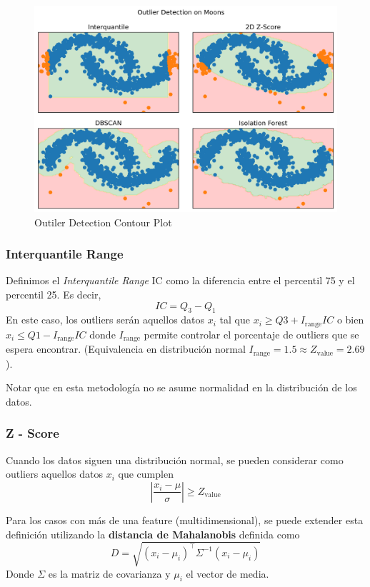 \begin{figure}[H]
    \center
    \includegraphics[scale=0.55]{notebooks/Others/img/outlier_detection.png}
    \caption{Outiler Detection Contour Plot}
\end{figure}

\subsubsection{Interquantile Range}

Definimos el \textit{Interquantile Range} IC como la diferencia entre el percentil 75 y el percentil 25. Es decir, 
$$ 
IC = Q_3 - Q_1
$$
En este caso, los outliers serán aquellos datos $x_i$ tal que 
$x_i \geq Q3 + I_{\text{range}}IC$ o bien $x_i \leq Q1 - I_{\text{range}}IC$
donde $ I_{\text{range}}$ permite controlar el porcentaje de outliers que se espera encontrar. (Equivalencia en distribución normal $I_{\text{range}} = 1.5 \approx Z_{\text{value}} = 2.69$).

Notar que en esta metodología no se asume normalidad en la distribución de los datos. 

\subsubsection{Z - Score}

Cuando los datos siguen una distribución normal, se pueden considerar como outliers aquellos datos $x_i$ que cumplen 
$$\left | \frac{x_i - \mu}{\sigma}\right | \geq Z_{\text{value}}$$

Para los casos con más de una feature (multidimensional), se puede extender esta definición utilizando la \textbf{distancia de Mahalanobis} definida como 
$$
D = \sqrt{(x_i - \mu_i)^{\top}\Sigma^{-1}(x_i - \mu_i)}
$$
Donde $\Sigma$ es la matriz de covarianza y $\mu_i$ el vector de media. 

